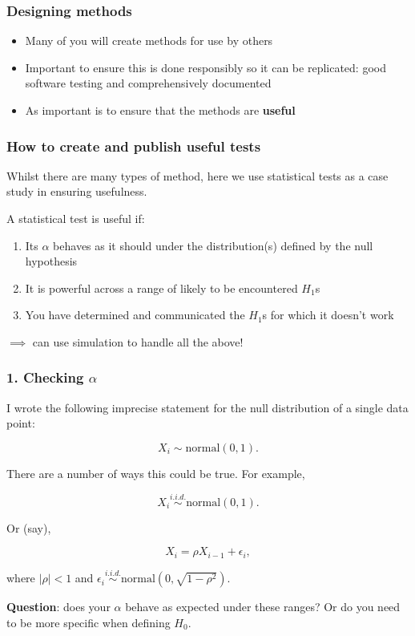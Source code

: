 \documentclass[handout]{beamer}
\begin{document}
\begin{frame}
	\frametitle{Designing methods}
	
	\begin{itemize}
		\item Many of you will create methods for use by others
		\item Important to ensure this is done responsibly so it can be replicated: good software testing and comprehensively documented
		\item As important is to ensure that the methods are \textbf{useful}
	\end{itemize}
	
\end{frame}

\begin{frame}
	\frametitle{How to create and publish useful tests}
	
	Whilst there are many types of method, here we use statistical tests as a case study in ensuring usefulness.
	
	\vspace{0.5cm}
	
	A statistical test is useful if:
	
	\begin{enumerate}
		\item Its $\alpha$ behaves as it should under the distribution(s) defined by the null hypothesis
		\item It is powerful across a range of likely to be encountered $H_1$s
		\item You have determined and communicated the $H_1$s for which it doesn't work
	\end{enumerate}
	
	$\implies$ can use simulation to handle all the above!
	
\end{frame}

\begin{frame}
	\frametitle{1. Checking $\alpha$}
	
	I wrote the following imprecise statement for the null distribution of a single data point:
	
	\begin{equation}
	X_i \sim \text{normal}(0, 1).
	\end{equation}
	
	There are a number of ways this could be true. For example,
	
	\begin{equation}
	X_i \stackrel{i.i.d.}{\sim} \text{normal}(0, 1).
	\end{equation}	
	
	Or (say),
	
	\begin{equation}
	X_i = \rho X_{i-1} + \epsilon_i,
	\end{equation}
	
	where $|\rho|<1$ and $\epsilon_i \stackrel{i.i.d.}{\sim} \text{normal}(0,\sqrt{1-\rho^2})$.
	
	\textbf{Question}: does your $\alpha$ behave as expected under these ranges? Or do you need to be more specific when defining $H_0$.
	
\end{frame}
\end{document}

